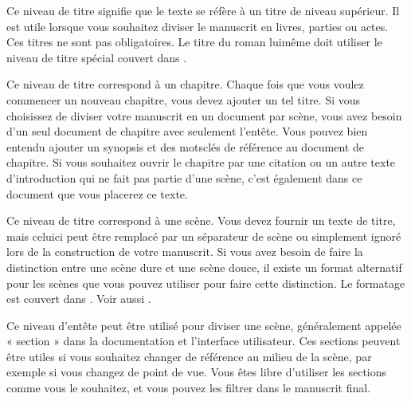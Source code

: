 \documentclass[a4paper,11pt,french]{sphinxmanual}
\begin{document}
\begin{description}
\sphinxAtStartPar
Ce niveau de titre signifie que le texte se réfère à un titre de niveau supérieur. Il est utile lorsque vous souhaitez diviser le manuscrit en livres, parties ou actes. Ces titres ne sont pas obligatoires. Le titre du roman lui\sphinxhyphen{}même doit utiliser le niveau de titre spécial \sphinxcode{\sphinxupquote{\#!}} couvert dans {\hyperref[\detokenize{usage_format:a-fmt-head}]{}}.

\sphinxAtStartPar
Ce niveau de titre correspond à un chapitre. Chaque fois que vous voulez commencer un nouveau chapitre, vous devez ajouter un tel titre. Si vous choisissez de diviser votre manuscrit en un document par scène, vous avez besoin d’un seul document de chapitre avec seulement l’en\sphinxhyphen{}tête. Vous pouvez bien entendu ajouter un synopsis et des mots\sphinxhyphen{}clés de référence au document de chapitre. Si vous souhaitez ouvrir le chapitre par une citation ou un autre texte d’introduction qui ne fait pas partie d’une scène, c’est également dans ce document que vous placerez ce texte.

\sphinxAtStartPar
Ce niveau de titre correspond à une scène. Vous devez fournir un texte de titre, mais celui\sphinxhyphen{}ci peut être remplacé par un séparateur de scène ou simplement ignoré lors de la construction de votre manuscrit. Si vous avez besoin de faire la distinction entre une scène dure et une scène douce, il existe un format alternatif pour les scènes que vous pouvez utiliser pour faire cette distinction. Le formatage est couvert dans {\hyperref[\detokenize{usage_format:a-fmt-head}]{}}. Voir aussi {\hyperref[\detokenize{project_structure:a-struct-heads-scenes}]{}}.

\sphinxAtStartPar
Ce niveau d’en\sphinxhyphen{}tête peut être utilisé pour diviser une scène, généralement appelée « section » dans la documentation et l’interface utilisateur. Ces sections peuvent être utiles si vous souhaitez changer de référence au milieu de la scène, par exemple si vous changez de point de vue. Vous êtes libre d’utiliser les sections comme vous le souhaitez, et vous pouvez les filtrer dans le manuscrit final.

\end{description}
\end{document}
